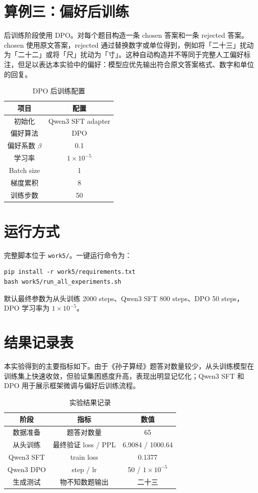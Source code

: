 \documentclass[a4paper,10pt,twocolumn]{article}
\begin{document}
\section{算例三：偏好后训练}
后训练阶段使用 DPO。对每个题目构造一条 chosen 答案和一条 rejected 答案。chosen 使用原文答案，rejected 通过替换数字或单位得到，例如将「二十三」扰动为「二十二」或将「尺」扰动为「寸」。这种自动构造并不等同于完整人工偏好标注，但足以表达本实验中的偏好：模型应优先输出符合原文答案格式、数字和单位的回复。

\begin{table}[H]
\centering
\small
\caption{DPO 后训练配置}
\begin{tabular}{c|c}
\toprule
项目 & 配置 \\
\midrule
初始化 & Qwen3 SFT adapter \\
偏好算法 & DPO \\
偏好系数 $\beta$ & 0.1 \\
学习率 & $1\times10^{-5}$ \\
Batch size & 1 \\
梯度累积 & 8 \\
训练步数 & 50 \\
\bottomrule
\end{tabular}
\end{table}

\section{运行方式}
完整脚本位于 \texttt{work5/}。一键运行命令为：
\begin{verbatim}
pip install -r work5/requirements.txt
bash work5/run_all_experiments.sh
\end{verbatim}
默认最终参数为从头训练 2000 steps、Qwen3 SFT 800 steps、DPO 50 steps，DPO 学习率为 $1\times10^{-5}$。

\section{结果记录表}
本实验得到的主要指标如下。由于《孙子算经》题答对数量较少，从头训练模型在训练集上快速收敛，但验证集困惑度升高，表现出明显记忆化；Qwen3 SFT 和 DPO 用于展示框架微调与偏好后训练流程。

\begin{table}[H]
\centering
\small
\caption{实验结果记录}
\begin{tabular}{c|c|c}
\toprule
阶段 & 指标 & 数值 \\
\midrule
数据准备 & 题答对数量 & 65 \\
从头训练 & 最终验证 loss / PPL & 6.9084 / 1000.64 \\
Qwen3 SFT & train loss & 0.1377 \\
Qwen3 DPO & step / lr & 50 / $1\times10^{-5}$ \\
生成测试 & 物不知数题输出 & 二十三 \\
\bottomrule
\end{tabular}
\end{table}
\end{document}
